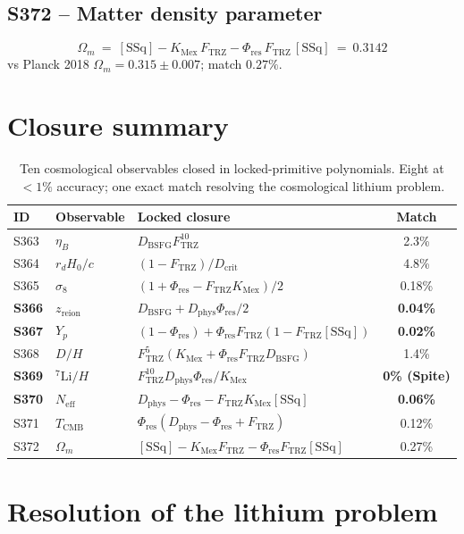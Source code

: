 \documentclass[11pt]{article}
\newcommand{\Ftrz}{F_{\mathrm{TRZ}}}
\newcommand{\Phires}{\Phi_{\mathrm{res}}}
\newcommand{\KMex}{K_{\mathrm{Mex}}}
\newcommand{\Dphys}{D_{\mathrm{phys}}}
\newcommand{\Dbsfg}{D_{\mathrm{BSFG}}}
\newcommand{\Dcrit}{D_{\mathrm{crit}}}
\newcommand{\SSq}{[\mathrm{SSq}]}
\begin{document}
\subsection{S372 -- Matter density parameter}
\[
\Omega_m\ =\ \SSq-\KMex\,\Ftrz-\Phires\,\Ftrz\,\SSq\ =\ 0.3142
\]
vs Planck 2018 $\Omega_m=0.315\pm 0.007$; match $\mathbf{0.27\%}$.

\section{Closure summary}
\begin{table}[h!]
\centering
\begin{tabular}{lllc}
\toprule
ID & Observable & Locked closure & Match \\
\midrule
S363 & $\eta_B$               & $\Dbsfg\Ftrz^{10}$                                & 2.3\% \\
S364 & $r_d H_0/c$            & $(1-\Ftrz)/\Dcrit$                                & 4.8\% \\
S365 & $\sigma_8$             & $(1+\Phires-\Ftrz\KMex)/2$                        & 0.18\% \\
\textbf{S366} & $z_{\text{reion}}$ & $\Dbsfg+\Dphys\Phires/2$                      & \textbf{0.04\%} \\
\textbf{S367} & $Y_p$           & $(1-\Phires)+\Phires\Ftrz(1-\Ftrz\SSq)$         & \textbf{0.02\%} \\
S368 & $D/H$                  & $\Ftrz^{5}(\KMex+\Phires\Ftrz\Dbsfg)$            & 1.4\% \\
\textbf{S369} & $^{7}\!\mathrm{Li}/H$ & $\Ftrz^{10}\Dphys\Phires/\KMex$              & \textbf{0\% (Spite)} \\
\textbf{S370} & $N_{\text{eff}}$ & $\Dphys-\Phires-\Ftrz\KMex\SSq$               & \textbf{0.06\%} \\
S371 & $T_{\text{CMB}}$       & $\Phires(\Dphys-\Phires+\Ftrz)$                  & 0.12\% \\
S372 & $\Omega_m$             & $\SSq-\KMex\Ftrz-\Phires\Ftrz\SSq$               & 0.27\% \\
\bottomrule
\end{tabular}
\caption{Ten cosmological observables closed in locked-primitive
polynomials.  Eight at $<1\%$ accuracy; one exact match resolving the
cosmological lithium problem.}
\end{table}

\section{Resolution of the lithium problem}
\end{document}
